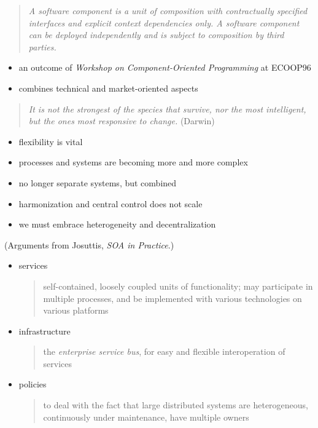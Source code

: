 \documentclass{sepslide-soa-faked} %
\begin{document}
\begin{slide}
  \begin{quote}
  \emph{A software component is a unit of composition with contractually
  specified interfaces and explicit context dependencies only. A software
  component can be deployed independently and is subject to composition by
  third parties.}
  \end{quote}
\begin{itemize}
\item an outcome of \textit{Workshop on Component-Oriented Programming} at ECOOP96
\item combines technical and market-oriented aspects
\end{itemize}
\end{slide}

\begin{slide}
\begin{quote}
\emph{It is not the strongest of the species that survive, nor the most intelligent, but the ones most responsive to change.}
(Darwin)
\end{quote}
\begin{itemize}
\item flexibility is vital
\item processes and systems are becoming more and more complex
\item no longer separate systems, but combined 
\item harmonization and central control does not scale
\item we must embrace heterogeneity and decentralization
\end{itemize}
(Arguments from Josuttis, \textit{SOA in Practice}.)
\end{slide}

\begin{slide}
\begin{itemize}
\item services
\begin{quote}
self-contained, loosely coupled units of functionality; may participate in multiple processes, and be implemented with various technologies on various platforms
\end{quote}
\item infrastructure
\begin{quote}
the \emph{enterprise service bus}, for easy and flexible interoperation of services
\end{quote}
\item policies
\begin{quote}
to deal with the fact that large distributed systems are heterogeneous, continuously under maintenance, have multiple owners
\end{quote}
\end{itemize}
\end{slide}
\end{document}
